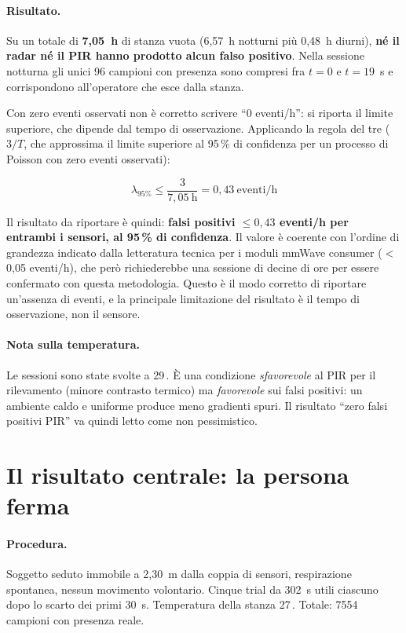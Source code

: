 \paragraph{Risultato.} Su un totale di \textbf{7,05~h} di stanza vuota
(6,57~h notturni più 0,48~h diurni), \textbf{né il radar né il PIR hanno prodotto
alcun falso positivo}. Nella sessione notturna gli unici 96 campioni con presenza
sono compresi fra $t=0$ e $t=19$~s e corrispondono all'operatore che esce dalla
stanza.

Con zero eventi osservati non è corretto scrivere ``0 eventi/h'': si riporta il
limite superiore, che dipende dal tempo di osservazione. Applicando la regola del
tre ($3/T$, che approssima il limite superiore al 95\,\% di confidenza per un
processo di Poisson con zero eventi osservati):

\begin{equation}
\lambda_{95\%} \leq \frac{3}{7{,}05~\text{h}} = 0{,}43~\text{eventi/h}
\label{eq:regola-tre}
\end{equation}

Il risultato da riportare è quindi: \textbf{falsi positivi $\leq 0{,}43$ eventi/h
per entrambi i sensori, al 95\,\% di confidenza}. Il valore è coerente con l'ordine
di grandezza indicato dalla letteratura tecnica per i moduli mmWave consumer
($<$0,05 eventi/h), che però richiederebbe una sessione di decine di ore per essere
confermato con questa metodologia. Questo è il modo corretto di riportare
un'assenza di eventi, e la principale limitazione del risultato è il tempo di
osservazione, non il sensore.

\paragraph{Nota sulla temperatura.} Le sessioni sono state svolte a 29\,\celsius. È
una condizione \emph{sfavorevole} al PIR per il rilevamento (minore contrasto
termico) ma \emph{favorevole} sui falsi positivi: un ambiente caldo e uniforme
produce meno gradienti spuri. Il risultato ``zero falsi positivi PIR'' va quindi
letto come non pessimistico.

\section{Il risultato centrale: la persona ferma}
\label{sec:persona-ferma}

\paragraph{Procedura.} Soggetto seduto immobile a 2,30~m dalla coppia di sensori,
respirazione spontanea, nessun movimento volontario. Cinque trial da 302~s utili
ciascuno dopo lo scarto dei primi 30~s. Temperatura della stanza 27\,\celsius.
Totale: 7554 campioni con presenza reale.

